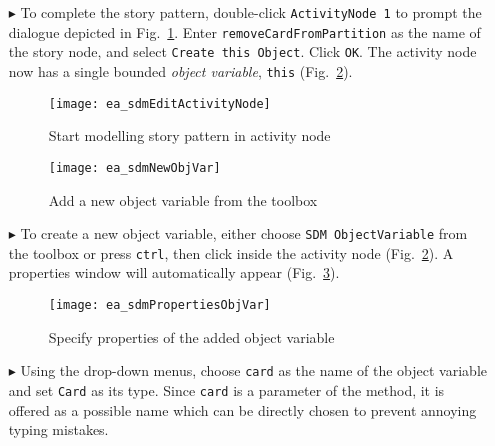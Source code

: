 \begin{itemize}
\vspace{0.5cm}

\item[$\blacktriangleright$] To complete the story pattern, double-click \texttt{ActivityNode 1} to prompt the dialogue depicted in
Fig.~\ref{fig:story_pattern}. Enter \texttt{removeCardFromPartition} as the name of the story node, and select \texttt{Create this Object}.  Click
\texttt{OK}. The activity node now has a single bounded \emph{object variable}, \texttt{this} (Fig.~\ref{fig:tool_box}).

\begin{figure}[htpb]
\begin{center} 
  \texttt{[image: ea\_sdmEditActivityNode]}
  \caption{Start modelling story pattern in activity node}  
  \label{fig:story_pattern}
\end{center}
\end{figure}

\begin{figure}[htp]
\begin{center}
  \texttt{[image: ea\_sdmNewObjVar]}
  \caption{Add a new object variable from the toolbox}  
  \label{fig:tool_box}
\end{center}
\end{figure}

\newpage

\item[$\blacktriangleright$] To create a new object variable, either choose \texttt{SDM ObjectVariable} from the toolbox or press \texttt{ctrl}, then
click inside the activity node (Fig.~\ref{fig:tool_box}). A properties window will automatically appear (Fig.~\ref{fig:object_variable_properties}).

\vspace{0.5cm}

\begin{figure}[htp]
\begin{center}
  \texttt{[image: ea\_sdmPropertiesObjVar]}
  \caption{Specify properties of the added object variable}  
  \label{fig:object_variable_properties}
\end{center}
\end{figure}


\item[$\blacktriangleright$] Using the drop-down menus, choose \texttt{card} as the name of the object variable and set \texttt{Card} as its type.
Since \texttt{card} is a parameter of the method, it is offered as a possible name which can be directly chosen to prevent annoying typing mistakes.


\end{itemize}
